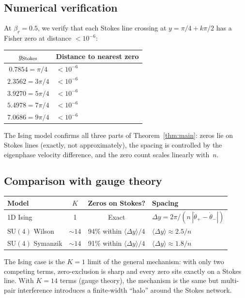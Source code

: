 \documentclass[12pt]{article}
\theoremstyle{definition}
\theoremstyle{remark}
\newcommand{\SU}{\mathrm{SU}}
\newcommand{\avg}[1]{\langle #1 \rangle}
\begin{document}
\subsection{Numerical verification}

At $\beta_r = 0.5$, we verify that each Stokes line crossing at
$y = \pi/4 + k\pi/2$ has a Fisher zero at distance $< 10^{-6}$:

\begin{center}
\begin{tabular}{cl}
\toprule
$y_{\rm Stokes}$ & Distance to nearest zero \\
\midrule
$0.7854 = \pi/4$ & $< 10^{-6}$ \\
$2.3562 = 3\pi/4$ & $< 10^{-6}$ \\
$3.9270 = 5\pi/4$ & $< 10^{-6}$ \\
$5.4978 = 7\pi/4$ & $< 10^{-6}$ \\
$7.0686 = 9\pi/4$ & $< 10^{-6}$ \\
\bottomrule
\end{tabular}
\end{center}

The Ising model confirms all three parts of Theorem~\ref{thm:main}:
zeros lie on Stokes lines (exactly, not approximately), the spacing
is controlled by the eigenphase velocity difference, and the zero
count scales linearly with~$n$.

\subsection{Comparison with gauge theory}

\begin{center}
\begin{tabular}{lccl}
\toprule
Model & $K$ & Zeros on Stokes? & Spacing \\
\midrule
1D Ising & 1 & Exact & $\Delta y = 2\pi/(n\,|\dot\theta_+ - \dot\theta_-|)$ \\
$\SU(4)$ Wilson & $\sim 14$ & 94\% within $\avg{\Delta y}/4$ &
  $\avg{\Delta y} \approx 2.5/n$ \\
$\SU(4)$ Symanzik & $\sim 14$ & 91\% within $\avg{\Delta y}/4$ &
  $\avg{\Delta y} \approx 1.8/n$ \\
\bottomrule
\end{tabular}
\end{center}

The Ising case is the $K = 1$ limit of the general mechanism: with
only two competing terms, zero-exclusion is sharp and every zero
sits exactly on a Stokes line.  With $K = 14$ terms (gauge theory),
the mechanism is the same but multi-pair interference introduces
a finite-width ``halo'' around the Stokes network.
\end{document}
